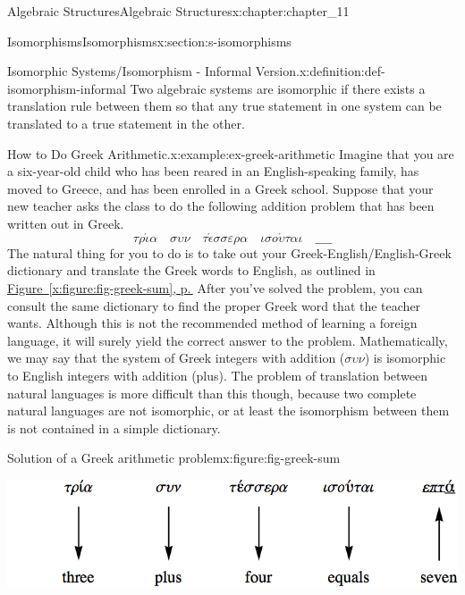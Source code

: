\documentclass[twoside,10pt,]{book}
\newcommand{\xreffont}{\relax}
\numberwithin{equation}{section}
\begin{document}
\begin{chapterptx}{Algebraic Structures}{}{Algebraic Structures}{}{}{x:chapter:chapter_11}
\begin{sectionptx}{Isomorphisms}{}{Isomorphisms}{}{}{x:section:s-isomorphisms}
\begin{introduction}{}
\begin{definition}{Isomorphic Systems\slash{}Isomorphism - Informal Version.}{x:definition:def-isomorphism-informal}
Two algebraic systems are isomorphic if there exists a translation rule between them so that any true statement in one system can be translated to a true statement in the other.%
\end{definition}
\begin{example}{How to Do Greek Arithmetic.}{x:example:ex-greek-arithmetic}%
Imagine that you are a six-year-old child who has been reared in an English-speaking family, has moved to Greece, and has been enrolled in a Greek school. Suppose that your new teacher asks the class to do the following addition problem that has been written out in Greek.%
\begin{equation*}
\tau \rho \acute{\iota} \alpha \quad \sigma \upsilon \nu \quad  \tau \acute{\epsilon} \sigma \sigma \varepsilon \rho \alpha \quad \iota \sigma o \acute{\upsilon} \tau \alpha \iota \quad \_\_\_\_
\end{equation*}
The natural thing for you to do is to take out your Greek-English\slash{}English-Greek dictionary and translate the Greek words to English, as outlined in \hyperref[x:figure:fig-greek-sum]{Figure~{\xreffont\ref{x:figure:fig-greek-sum}}, p.\,\pageref{x:figure:fig-greek-sum}} After you've solved the problem, you can consult the same dictionary to find the proper Greek word that the teacher wants. Although this is not the recommended method of learning a foreign language, it will surely yield the correct answer to the problem. Mathematically, we may say that the system of Greek integers with addition (\(\sigma \upsilon \nu\)) is isomorphic to English integers with addition (plus). The problem of translation between natural languages is more difficult than this though, because two complete natural languages are not isomorphic, or at least the isomorphism between them is not contained in a simple dictionary.%
\begin{figureptx}{Solution of a Greek arithmetic problem}{x:figure:fig-greek-sum}{}%
\begin{image}{0.15}{0.7}{0.15}%
\includegraphics[width=\linewidth]{images/fig-greek-sum.png}
\end{image}%
\tcblower
\end{figureptx}%
\end{example}

\end{introduction}
\end{sectionptx}
\end{chapterptx}
\end{document}
